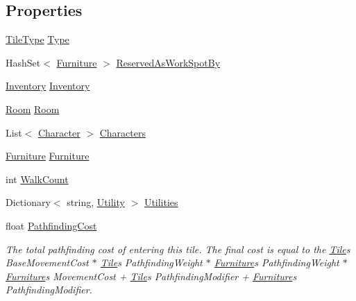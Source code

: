 \subsection*{Properties}
\begin{DoxyCompactItemize}
\item 
\hyperlink{class_tile_type}{Tile\+Type} \hyperlink{class_tile_ae81a2b6cfecac7ae9e0d246e97dad91e}{Type}
\item 
Hash\+Set$<$ \hyperlink{class_furniture}{Furniture} $>$ \hyperlink{class_tile_af57365d59cb055a342e5e56f237aaf8e}{Reserved\+As\+Work\+Spot\+By}
\item 
\hyperlink{class_inventory}{Inventory} \hyperlink{class_tile_a686d7969d77a7370c913d9980d264cd8}{Inventory}
\item 
\hyperlink{class_project_porcupine_1_1_rooms_1_1_room}{Room} \hyperlink{class_tile_ac5e22a506cb6c40aa6e73ad091ef89bf}{Room}
\item 
List$<$ \hyperlink{class_project_porcupine_1_1_entities_1_1_character}{Character} $>$ \hyperlink{class_tile_a17d6d1ccd67d0c6335de52a12c2d98a6}{Characters}
\item 
\hyperlink{class_furniture}{Furniture} \hyperlink{class_tile_a2c237270d1174c03c33afd93c7759491}{Furniture}
\item 
int \hyperlink{class_tile_a3f200b79ce637c1b70dcedf6b7ca21b4}{Walk\+Count}
\item 
Dictionary$<$ string, \hyperlink{class_utility}{Utility} $>$ \hyperlink{class_tile_a2073539dbc53f09e81b688dacfc4efb7}{Utilities}
\item 
float \hyperlink{class_tile_a6dbcb3c830e1bb4447ed95a010bdf244}{Pathfinding\+Cost}
\begin{DoxyCompactList}\small\item\em The total pathfinding cost of entering this tile. The final cost is equal to the \hyperlink{class_tile}{Tile}\textquotesingle{}s Base\+Movement\+Cost $\ast$ \hyperlink{class_tile}{Tile}\textquotesingle{}s Pathfinding\+Weight $\ast$ \hyperlink{class_furniture}{Furniture}\textquotesingle{}s Pathfinding\+Weight $\ast$ \hyperlink{class_furniture}{Furniture}\textquotesingle{}s Movement\+Cost + \hyperlink{class_tile}{Tile}\textquotesingle{}s Pathfinding\+Modifier + \hyperlink{class_furniture}{Furniture}\textquotesingle{}s Pathfinding\+Modifier. \end{DoxyCompactList}\item 

\end{DoxyCompactItemize}
